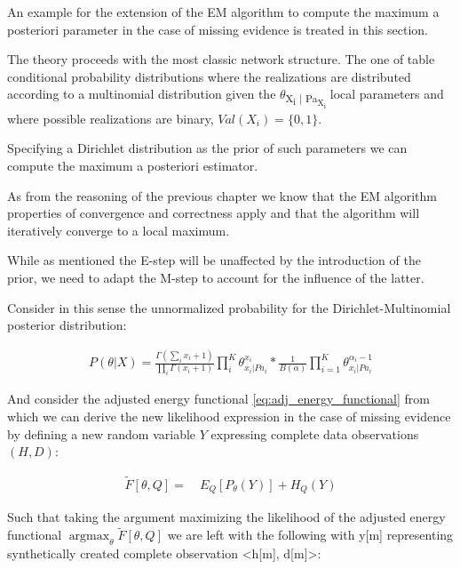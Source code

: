 \documentclass[11pt]{article}
\begin{document}
An example for the extension of the EM algorithm to compute the
maximum a posteriori parameter in the case of missing evidence is
treated in this section.

The theory proceeds with the most classic network structure. The
one of table conditional probability distributions where the
realizations are distributed according to a multinomial
distribution given the \(\theta\)\textsubscript{X\textsubscript{i} | Pa\textsubscript{X\textsubscript{i}}} local parameters and
where possible realizations are binary, \(Val(X_i) = \{0,1 \}\).

Specifying a Dirichlet distribution as the prior of such parameters
we can compute the maximum a posteriori estimator.

As from the reasoning of the previous chapter we know that the EM
algorithm properties of convergence and correctness apply and that
the algorithm will iteratively converge to a local maximum.

While as mentioned the E-step will be unaffected by the
introduction of the prior, we need to adapt the M-step to account
for the influence of the latter.

Consider in this sense the unnormalized probability for the
Dirichlet-Multinomial posterior distribution:

\begin{align} \label{eq:dirichlet-multinomial-score}
P(\theta | X) = \frac{\Gamma(\sum_i x_i + 1)}{\prod_i \Gamma(x_i + 1)} \prod_i^K \theta_{x_i | Pa_i}^{x_i}  * \frac{1}{B(\alpha)} \prod_{i=1}^K \theta_{x_i | Pa_i}^{\alpha_i - 1}
\end{align}

And consider the adjusted energy functional
\ref{eq:adj_energy_functional} from which we can derive the new
likelihood expression in the case of missing evidence by defining a
new random variable \(Y\) expressing complete data observations
\((H, D)\):

\begin{align} \label{eq:dirichlet-multinomial-likelihood}
\tilde{F}[\theta, Q] =& \ E_Q[P_\theta(Y)] + H_Q (Y)
\end{align}

Such that taking the argument maximizing the likelihood of the
adjusted energy functional \(\operatorname*{argmax}_{\theta}
    \tilde{F}[\theta, Q]\) we are left with the following with y[m]
representing synthetically created complete observation <h[m],
d[m]>:
\end{document}
